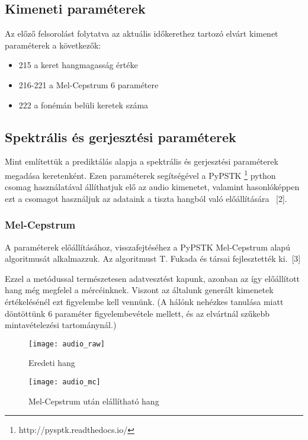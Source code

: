 \subsection{Kimeneti paraméterek}
Az előző felsorolást folytatva az aktuális időkerethez tartozó elvárt kimenet paraméterek a következők:

 
\begin{itemize}
	\item 215 a keret hangmagasság értéke
	\item 216-221 a Mel-Cepstrum 6 paramétere
	\item 222 a fonémán belüli keretek száma
\end{itemize}
\subsection{Spektrális és gerjesztési paraméterek}
Mint említettük a prediktálás alapja a spektrális és gerjesztési paraméterek megadása keretenként. Ezen paraméterek segítségével a PyPSTK
\footnote{http://pysptk.readthedocs.io/}
python csomag használatával állíthatjuk elő az audio kimenetet, valamint hasonlóképpen ezt a csomagot használjuk az adataink a tiszta hangból való előállítására \ [2].
\subsubsection{Mel-Cepstrum}
A paraméterek előállításához, visszafejtéséhez a PyPSTK Mel-Cepstrum alapú algoritmusát alkalmazzuk. Az algoritmust T. Fukada és társai fejlesztették ki.\ [3]


Ezzel a metódussal természetesen adatvesztést kapunk, azonban az így előállított hang még megfelel a mércéinknek. Viszont az általunk generált kimenetek értékelésénél ezt figyelembe kell vennünk. (A hálónk nehézkes tanulása miatt döntöttünk 6 paraméter figyelembevétele mellett, és az elvártnál szűkebb mintavételezési tartománynál.)
\begin{figure}[h]
	\par
	\texttt{[image: audio\_raw]}
	\caption{Eredeti hang}
\end{figure}
\begin{figure}[h]
	\par
	\texttt{[image: audio\_mc]}
	\caption{Mel-Cepstrum után elállítható hang}
\end{figure}

